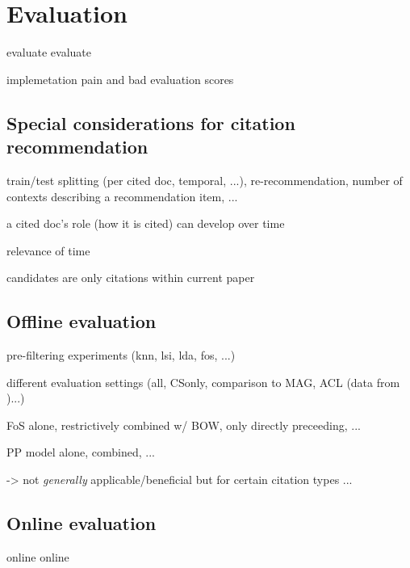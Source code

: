 \chapter{Evaluation}\label{chap:evaluation}
evaluate evaluate

implemetation pain and bad evaluation scores\cite{Beel2017}

\section{Special considerations for citation recommendation}
train/test splitting (per cited doc, temporal, ...), re-recommendation, number of contexts describing a recommendation item, ...

a cited doc's role (how it is cited) can develop over time\cite{Swales1986,He2018}

relevance of time\cite{Beel2017a}

candidates are only citations within current paper\cite{Duma2014}

\section{Offline evaluation}
pre-filtering experiments (knn\cite{Bhagavatula2018}, lsi, lda, fos, ...)

different evaluation settings (all, CSonly, comparison to MAG, ACL (data from \cite{Faerber2018b})...)

FoS alone, restrictively combined w/ BOW, only directly preceeding, ...

PP model alone, combined, ...

-> not \emph{generally} applicable/beneficial but for certain citation types ...

\section{Online evaluation}
online online
